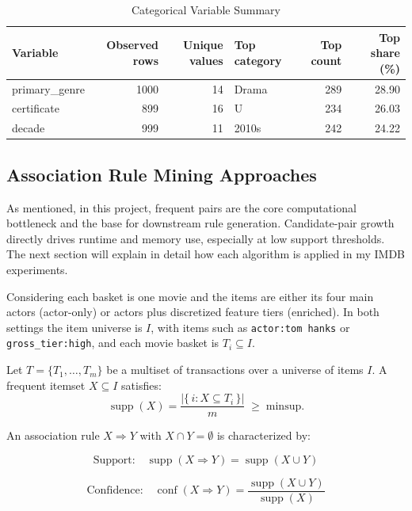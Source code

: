 \documentclass{article}  %
\begin{document}
\begin{table}[!htbp]
    \caption{Categorical Variable Summary}
    \centering
    \begin{tabular}{lrrlrr}
        \toprule
        \textbf{Variable} & \textbf{Observed rows} & \textbf{Unique values} & \textbf{Top category} & \textbf{Top count} & \textbf{Top share (\%)} \\
        \midrule
        primary\_genre & 1000 & 14 & Drama  & 289 & 28.90 \\
        certificate    & 899  & 16 & U      & 234 & 26.03 \\
        decade         & 999  & 11 & 2010s  & 242 & 24.22 \\
        \bottomrule
    \end{tabular}
    \label{tab:4}
\end{table}


\FloatBarrier

\subsection{Association Rule Mining Approaches}

As mentioned, in this project, frequent pairs are the core computational bottleneck and the base for downstream rule generation. Candidate-pair growth directly drives runtime and memory use, especially at low support thresholds.  The next section will explain in detail how each algorithm is applied in my IMDB experiments.

Considering each basket is one movie and the items are either its four main actors (actor-only) or actors plus discretized feature tiers (enriched). In both settings the item universe is \(I\), with items such as \verb|actor:tom hanks| or \verb|gross_tier:high|, and each movie basket is \(T_i \subseteq I\).  

Let \(T = \{T_{1}, \ldots, T_{m}\}\) be a multiset of transactions over a universe of items \(I\).
A frequent itemset \(X \subseteq I\) satisfies:
\[
\operatorname{supp}(X)
= \frac{\left|\{\,i : X \subseteq T_{i}\,\}\right|}{m}
\;\ge\; \mathrm{minsup}.
\]

An association rule \(X \Rightarrow Y\) with \(X \cap Y = \emptyset\) is characterized by:

\[
\text{Support:}\quad
\operatorname{supp}(X \Rightarrow Y) = \operatorname{supp}(X \cup Y)
\]

\[
\text{Confidence:}\quad
\operatorname{conf}(X \Rightarrow Y)
= \frac{\operatorname{supp}(X \cup Y)}{\operatorname{supp}(X)}
\]
\end{document}
